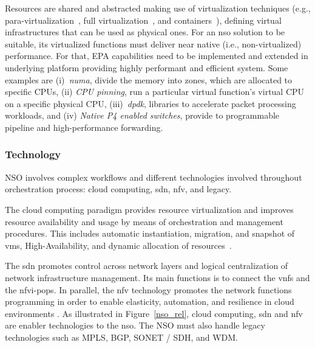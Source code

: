 Resources are shared and abstracted making use of virtualization techniques (e.g., para-virtualization~\cite{4299349}, full virtualization~\cite{4482796}, and containers~\cite{6906035}), defining virtual infrastructures that can be used as physical ones.
For an \gls{nso} solution to be suitable, its virtualized functions must deliver near native (i.e., non-virtualized) performance. For that, EPA capabilities need to be implemented and extended in underlying platform providing highly performant and efficient system. Some examples are (i)\textit{~\gls{numa}}, divide the memory into zones, which are allocated to specific CPUs, (ii) \textit{CPU pinning}, run a particular virtual function’s virtual CPU on a specific physical CPU, (iii)~\textit{\gls{dpdk}}, libraries to accelerate packet processing workloads, and (iv) \textit{Native P4 enabled switches}, provide to programmable pipeline and high-performance forwarding. 



\subsubsection{Technology}
NSO involves complex workflows and different technologies involved throughout orchestration process: cloud computing, \gls{sdn}, \gls{nfv}, and legacy.      

The cloud computing paradigm provides resource virtualization and improves resource availability and usage by means of orchestration and management procedures. This includes automatic instantiation, migration, and snapshot of \glspl{vm}, High-Availability, and dynamic allocation of resources~\cite{ETSI2012NetworkAction}. 

The \gls{sdn} promotes control across network layers and logical centralization of network infrastructure management. Its main functions is to connect the \glspl{vnf} and the \gls{nfvi}-\glspl{pop}. In parallel, the \gls{nfv} technology promotes the network functions programming in order to enable elasticity, automation, and resilience in cloud environments \cite{Rotsos2017NetworkSurvey}. As illustrated in Figure~\ref{nso_rel}, cloud computing, \gls{sdn} and \gls{nfv} are enabler technologies to the \gls{nso}. The NSO must also handle legacy technologies such as MPLS, BGP, SONET / SDH, and WDM. 

